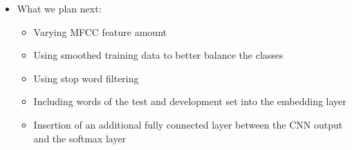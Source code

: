 \documentclass[a0,landscape]{a0poster}
\begin{document}
\begin{multicols}{3}
\begin{itemize}
	\item What we plan next:
	\begin{itemize}
		\item Varying MFCC feature amount
		\item Using smoothed training data to better balance the classes
		\item Using stop word filtering 
		\item Including words of the test and development set into the embedding layer
		\item Insertion of an additional fully connected layer between the CNN output and the softmax layer
	
	\end{itemize}		
\end{itemize}


%
\nocite{*} %
%
%
%
%

\end{multicols}
\end{document}
